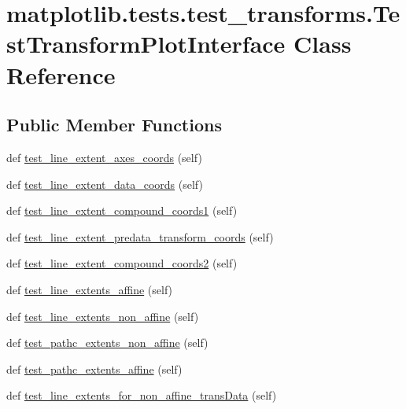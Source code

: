 \hypertarget{classmatplotlib_1_1tests_1_1test__transforms_1_1TestTransformPlotInterface}{}\section{matplotlib.\+tests.\+test\+\_\+transforms.\+Test\+Transform\+Plot\+Interface Class Reference}
\label{classmatplotlib_1_1tests_1_1test__transforms_1_1TestTransformPlotInterface}
\subsection*{Public Member Functions}
\begin{DoxyCompactItemize}
\item 
def \hyperlink{classmatplotlib_1_1tests_1_1test__transforms_1_1TestTransformPlotInterface_a674b006698d10f4a0ce6a34325b1ab89}{test\+\_\+line\+\_\+extent\+\_\+axes\+\_\+coords} (self)
\item 
def \hyperlink{classmatplotlib_1_1tests_1_1test__transforms_1_1TestTransformPlotInterface_a5f7b90959f78d93f7bcd5f769559187a}{test\+\_\+line\+\_\+extent\+\_\+data\+\_\+coords} (self)
\item 
def \hyperlink{classmatplotlib_1_1tests_1_1test__transforms_1_1TestTransformPlotInterface_af6110647b897b8c98e223e4a167621db}{test\+\_\+line\+\_\+extent\+\_\+compound\+\_\+coords1} (self)
\item 
def \hyperlink{classmatplotlib_1_1tests_1_1test__transforms_1_1TestTransformPlotInterface_a2f704e290f6a9e26c6bddf40382d2228}{test\+\_\+line\+\_\+extent\+\_\+predata\+\_\+transform\+\_\+coords} (self)
\item 
def \hyperlink{classmatplotlib_1_1tests_1_1test__transforms_1_1TestTransformPlotInterface_ac324a78d8079d83ce2e0e58aee03fc1b}{test\+\_\+line\+\_\+extent\+\_\+compound\+\_\+coords2} (self)
\item 
def \hyperlink{classmatplotlib_1_1tests_1_1test__transforms_1_1TestTransformPlotInterface_aadd51f6b6ef59a6ae6f4132f1465f380}{test\+\_\+line\+\_\+extents\+\_\+affine} (self)
\item 
def \hyperlink{classmatplotlib_1_1tests_1_1test__transforms_1_1TestTransformPlotInterface_a6f5fe75c7f84846d088a175b6805bd3b}{test\+\_\+line\+\_\+extents\+\_\+non\+\_\+affine} (self)
\item 
def \hyperlink{classmatplotlib_1_1tests_1_1test__transforms_1_1TestTransformPlotInterface_a0ecdc1272c79044f817b2288611b9c8c}{test\+\_\+pathc\+\_\+extents\+\_\+non\+\_\+affine} (self)
\item 
def \hyperlink{classmatplotlib_1_1tests_1_1test__transforms_1_1TestTransformPlotInterface_ab493e16cfbb43ad7ea0be1d6354ac5b7}{test\+\_\+pathc\+\_\+extents\+\_\+affine} (self)
\item 
def \hyperlink{classmatplotlib_1_1tests_1_1test__transforms_1_1TestTransformPlotInterface_ae4f624b6961d27491e720bfc18f0b4b8}{test\+\_\+line\+\_\+extents\+\_\+for\+\_\+non\+\_\+affine\+\_\+trans\+Data} (self)
\end{DoxyCompactItemize}


